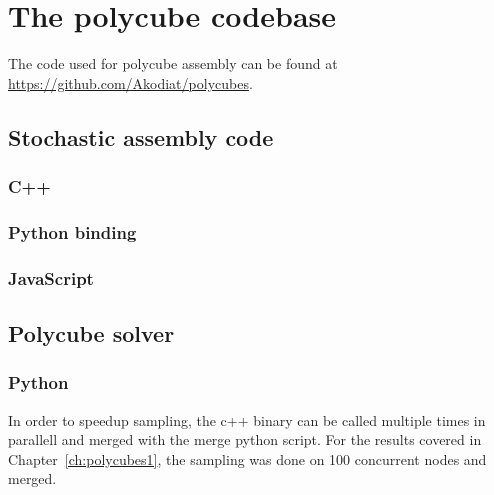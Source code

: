 

\chapter{The polycube codebase}
\label{ch:appendix_polycubes}

\minitoc

The code used for polycube assembly can be found at \url{https://github.com/Akodiat/polycubes}.

\section{Stochastic assembly code}

\subsection{C++}

\subsection{Python binding}

\subsection{JavaScript}

\section{Polycube solver}

\subsection{Python}
In order to speedup sampling, the c++ binary can be called multiple times in parallell and merged with the merge python script. For the results covered in Chapter~\ref{ch:polycubes1}, the sampling was done on 100 concurrent nodes and merged.

